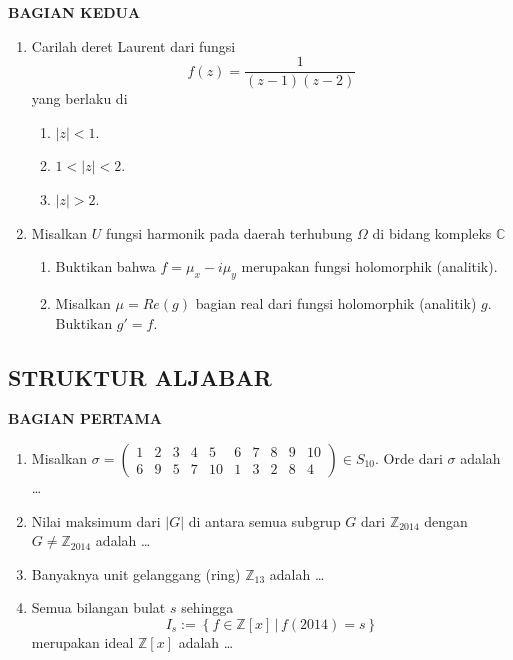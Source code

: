 \documentclass[12pt,twoside]{article}
\begin{document}
\newpage \textbf{BAGIAN KEDUA}
\begin{enumerate}
	\item Carilah deret Laurent dari fungsi
	      \begin{equation*}
		      f(z) = \dfrac{1}{(z-1)(z-2)}
	      \end{equation*}
	      yang berlaku di
	      \begin{enumerate}
		      \item $|z|< 1$.
		      \item $1<|z|<2$.
		      \item $|z|>2$.
	      \end{enumerate}

	\item Misalkan $U$ fungsi harmonik pada daerah terhubung $\Omega$ di bidang kompleks $\mathbb{C}$
	      \begin{enumerate}
		      \item Buktikan bahwa $f = \mu_x - i\mu_y$ merupakan fungsi holomorphik (analitik).
		      \item Misalkan $\mu = Re(g)$ bagian real dari fungsi holomorphik (analitik) $g$. Buktikan $g'=f$.
	      \end{enumerate}
\end{enumerate}

\pagebreak
\subsection{STRUKTUR ALJABAR}

\textbf{BAGIAN PERTAMA}
\begin{enumerate}
	\item Misalkan $\sigma = \left( \begin{array}{cccccccccc}
				      1 & 2 & 3 & 4 & 5  & 6 & 7 & 8 & 9 & 10 \\
				      6 & 9 & 5 & 7 & 10 & 1 & 3 & 2 & 8 & 4
			      \end{array} \right)\in S_{10}$. Orde dari $\sigma$ adalah \dots

	\item Nilai maksimum dari $|G|$ di antara semua subgrup $G$ dari $\mathbb{Z}_{2014}$ dengan $G \neq \mathbb{Z}_{2014}$ adalah \dots

	\item Banyaknya unit gelanggang (ring) $\mathbb{Z}_{13}$ adalah \dots

	\item Semua bilangan bulat $s$ sehingga
	      \begin{equation*}
		      I_s := \left\lbrace f \in \mathbb{Z}[x]\, | \, f(2014)=s \right\rbrace
	      \end{equation*}
	      merupakan ideal $\mathbb{Z}[x]$ adalah \dots
\end{enumerate}
\end{document}
